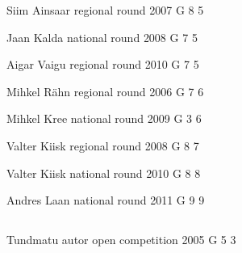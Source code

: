 \documentclass[11pt]{article}
\begin{document}
\ylDisplay{} %
{Siim Ainsaar} %
{regional round} %
{2007} %
{G 8} %
{5} %
{

\ifEngStatement
\fi
}

\ylDisplay{} %
{Jaan Kalda} %
{national round} %
{2008} %
{G 7} %
{5} %
{

\ifEngStatement
\fi
}

\ylDisplay{} %
{Aigar Vaigu} %
{regional round} %
{2010} %
{G 7} %
{5} %
{

\ifEngStatement
\fi
}

\ylDisplay{} %
{Mihkel Rähn} %
{regional round} %
{2006} %
{G 7} %
{6} %
{

\ifEngStatement
\fi
}

\ylDisplay{} %
{Mihkel Kree} %
{national round} %
{2009} %
{G 3} %
{6} %
{

\ifEngStatement
\fi
}

\ylDisplay{} %
{Valter Kiisk} %
{regional round} %
{2008} %
{G 8} %
{7} %
{

\ifEngStatement
\fi
}

\ylDisplay{} %
{Valter Kiisk} %
{national round} %
{2010} %
{G 8} %
{8} %
{

\ifEngStatement
\fi
}

\ylDisplay{} %
{Andres Laan} %
{national round} %
{2011} %
{G 9} %
{9} %
{

\ifEngStatement
\fi
}
\newpage\subsection{\protect{}}

\ylDisplay{} %
{Tundmatu autor} %
{open competition} %
{2005} %
{G 5} %
{3} %
{

\ifEngStatement
\fi
}
\end{document}
